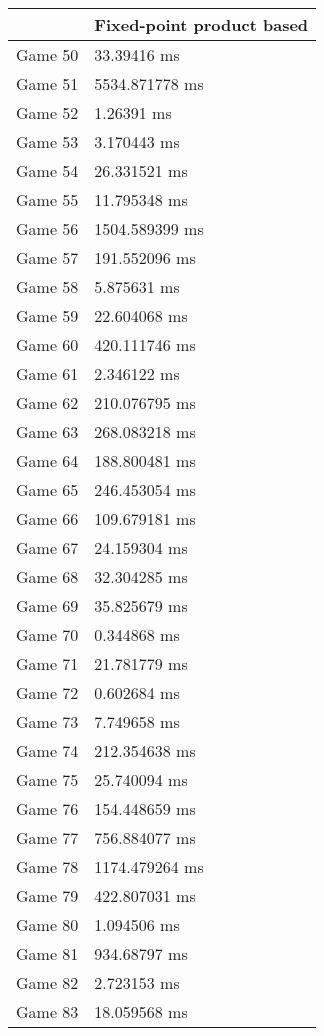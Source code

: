 \begin{tabular}{|l|l|}
	\hline
	& Fixed-point product based \\ \hline
	Game 50 & 33.39416 ms \\ \hline
	Game 51 & 5534.871778 ms \\ \hline
	Game 52 & 1.26391 ms \\ \hline
	Game 53 & 3.170443 ms \\ \hline
	Game 54 & 26.331521 ms \\ \hline
	Game 55 & 11.795348 ms \\ \hline
	Game 56 & 1504.589399 ms \\ \hline
	Game 57 & 191.552096 ms \\ \hline
	Game 58 & 5.875631 ms \\ \hline
	Game 59 & 22.604068 ms \\ \hline
	Game 60 & 420.111746 ms \\ \hline
	Game 61 & 2.346122 ms \\ \hline
	Game 62 & 210.076795 ms \\ \hline
	Game 63 & 268.083218 ms \\ \hline
	Game 64 & 188.800481 ms \\ \hline
	Game 65 & 246.453054 ms \\ \hline
	Game 66 & 109.679181 ms \\ \hline
	Game 67 & 24.159304 ms \\ \hline
	Game 68 & 32.304285 ms \\ \hline
	Game 69 & 35.825679 ms \\ \hline
	Game 70 & 0.344868 ms \\ \hline
	Game 71 & 21.781779 ms \\ \hline
	Game 72 & 0.602684 ms \\ \hline
	Game 73 & 7.749658 ms \\ \hline
	Game 74 & 212.354638 ms \\ \hline
	Game 75 & 25.740094 ms \\ \hline
	Game 76 & 154.448659 ms \\ \hline
	Game 77 & 756.884077 ms \\ \hline
	Game 78 & 1174.479264 ms \\ \hline
	Game 79 & 422.807031 ms \\ \hline
	Game 80 & 1.094506 ms \\ \hline
	Game 81 & 934.68797 ms \\ \hline
	Game 82 & 2.723153 ms \\ \hline
	Game 83 & 18.059568 ms \\ \hline

\end{tabular}
